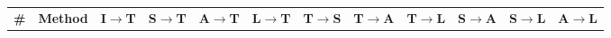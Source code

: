 \begin{table*}[!tbp]
\centering
\footnotesize
\renewcommand{\arraystretch}{1.05}  %
\setlength{\tabcolsep}{2.25mm}        %
{
\begin{tabular}{c|c|cccc|ccc|cc|c}
    \toprule[1.5pt]
    
    \textbf{\#} & \textbf{Method} & \textbf{I$\rightarrow$T} & \textbf{S$\rightarrow$T} & \textbf{A$\rightarrow$T} &  \textbf{L$\rightarrow$T} & \textbf{T$\rightarrow$S} & \textbf{T$\rightarrow$A} & \textbf{T$\rightarrow$L} & \textbf{S$\rightarrow$A} & \textbf{S$\rightarrow$L} & \textbf{A$\rightarrow$L} \\
    


\end{tabular}}
\end{table*}
